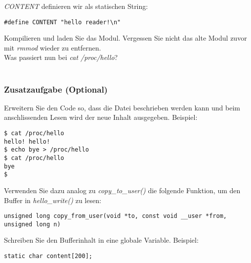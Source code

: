 \emph{CONTENT} definieren wir als statischen String:
\begin{lstlisting}
#define CONTENT "hello reader!\n"
\end{lstlisting}

Kompilieren und laden Sie das Modul. Vergessen Sie nicht das alte Modul zuvor mit \emph{rmmod} wieder zu entfernen. \\

Was passiert nun bei \emph{cat /proc/hello}? \\

\underline{\hspace{\textwidth}} \\


\subsubsection{Zusatzaufgabe (Optional)}

Erweitern Sie den Code so, dass die Datei beschrieben werden kann und beim anschlissenden Lesen wird der neue
Inhalt ausgegeben. Beispiel:
\begin{lstlisting}
$ cat /proc/hello
hello! hello!
$ echo bye > /proc/hello
$ cat /proc/hello
bye
$
\end{lstlisting}

Verwenden Sie dazu analog zu \emph{copy\_to\_user()} die folgende Funktion, um den Buffer in \emph{hello\_write()} zu lesen:
\begin{lstlisting}
unsigned long copy_from_user(void *to, const void __user *from, unsigned long n)
\end{lstlisting}
Schreiben Sie den Bufferinhalt in eine globale Variable. Beispiel:
\begin{lstlisting}
static char content[200];
\end{lstlisting}
